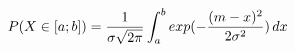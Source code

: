 \documentclass[preview]{standalone}
\begin{document}
\begin{align*}
P( X \in [a;b] ) = { \frac{1}{\sigma \sqrt{2\pi}} } \int_a^b { exp(-{ {(m - x)^2} \over {2 \sigma^2} }) } \, dx
\end{align*}
\end{document}
